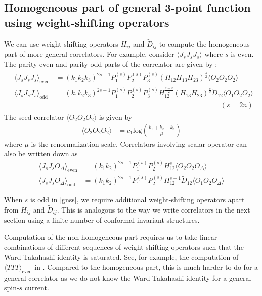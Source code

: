 \documentclass[a4paper,11pt]{article}
\begin{document}
\subsection{Homogeneous part of general 3-point function using weight-shifting operators}

We can use weight-shifting operators $H_{ij}$ and $\widetilde{D}_{ij}$ to compute the homogeneous part of more general correlators. For example, consider $\langle J_s J_s J_s \rangle$ where $s$ is even. The parity-even and parity-odd parts of the correlator are given by : 
\begin{align}\label{gnss}
    \begin{split}
        \langle J_s J_s J_s \rangle_{\text{even}} &= (k_1 k_2 k_3)^{2s-1}P_1^{(s)}P_2^{(s)}P_3^{(s)}(H_{12}H_{13}H_{23})^{\frac{s}{2}}\langle O_2 O_2 O_2 \rangle\\[5 pt]
        \langle J_s J_s J_s \rangle_{\text{odd}} &= (k_1 k_2 k_3)^{2s-1}P_1^{(s)}P_2^{(s)}P_3^{(s)}H_{12}^{\frac{s-2}{2}}(H_{13}H_{23})^{\frac{s}{2}}\widetilde{D}_{12} \langle O_1 O_2 O_2 \rangle
    \end{split}
    \begin{split}
        (s=2n)
    \end{split}
\end{align}
The seed correlator $\langle O_2 O_2 O_2 \rangle$ is given by
    \begin{align}
    \langle O_2 O_2 O_2 \rangle &= c_1 \text{log}\left(\frac{k_1+k_2+k_3}{\mu}\right)
\end{align}
where $\mu$ is the renormalization scale.
Correlators involving scalar operator can also be written down as
\begin{align}
        \langle J_s J_s O_{\Delta} \rangle_{\text{even}} &= (k_1 k_2 )^{2s-1}P_1^{(s)}P_2^{(s)}H_{12}^{s}\langle O_2 O_2 O_{\Delta} \rangle\\[5 pt]
        \langle J_s J_s O_{\Delta} \rangle_{\text{odd}} &= (k_1 k_2)^{2s-1}P_1^{(s)}P_2^{(s)}H_{12}^{s-1}\widetilde{D}_{12} \langle O_1 O_2 O_{\Delta} \rangle
\end{align}
\par
When $s$ is odd in \eqref{gnss}, we require additional weight-shifting operators apart from $H_{ij}$ and $\widetilde{D}_{ij}$. This is analogous to the way we write correlators in the next section using a finite number of conformal invariant structures.
\par
Computation of the non-homogeneous part requires us to take linear combinations of different sequences of weight-shifting operators such that the Ward-Takahashi identity is saturated. See, for example, the computation of $\langle TTT \rangle_{\text{even}}$ in \cite{Baumann:2020dch}. Compared to the homogeneous part, this is much harder to do for a general correlator as we do not know the Ward-Takahashi identity for a general spin-$s$ current. 
\end{document}
